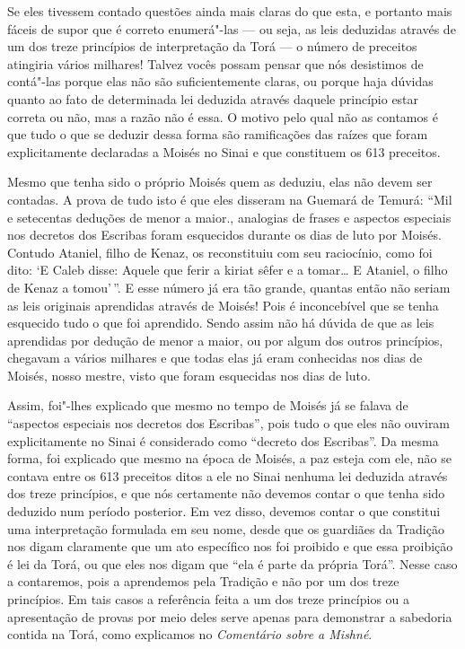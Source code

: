 Se eles tivessem contado questões ainda mais claras do que esta, e
portanto mais fáceis de supor que é correto enumerá"-las --- ou seja, as
leis deduzidas através de um dos treze princípios de interpretação da
Torá\starr{} --- o número de preceitos atingiria vários milhares! Talvez vocês
possam pensar que nós desistimos de contá"-las porque elas não são
suficientemente claras, ou porque haja dúvidas quanto ao fato de
determinada lei deduzida através daquele princípio estar correta ou não,
mas a razão não é essa. O motivo pelo qual não as contamos é que tudo o
que se deduzir dessa forma são ramificações das raízes que foram
explicitamente declaradas a Moisés no Sinai e que constituem os 613
preceitos.

Mesmo que tenha sido o próprio Moisés quem as deduziu, elas não devem
ser contadas. A prova de tudo isto é que eles disseram na Guemará\starr{} de
Temurá\starr: ``Mil e setecentas deduções de menor a maior., analogias de
frases e aspectos especiais nos decretos dos Escribas foram esquecidos
durante os dias de luto por Moisés. Contudo Ataniel, filho de Kenaz\starr, os
reconstituiu com seu raciocínio, como foi dito: `E Caleb\starr{} disse: Aquele
que ferir a kiriat sêfer\starr{} e a tomar\ldots{} E Ataniel, o filho de Kenaz\starr{} a
tomou'\,''. E esse número já era tão grande, quantas então não seriam as
leis originais aprendidas através de Moisés! Pois é inconcebível que se
tenha esquecido tudo o que foi aprendido. Sendo assim não há dúvida de
que as leis aprendidas por dedução de menor a maior, ou por algum dos
outros princípios, chegavam a vários milhares e que todas elas já eram
conhecidas nos dias de Moisés, nosso mestre, visto que foram esquecidas
nos dias de luto.

Assim, foi"-lhes explicado que mesmo no tempo de Moisés já se falava de
``aspectos especiais nos decretos dos Escribas'', pois tudo o que eles
não ouviram explicitamente no Sinai é considerado como ``decreto dos
Escribas''. Da mesma forma, foi explicado que mesmo na época de Moisés,
a paz esteja com ele, não se contava entre os 613 preceitos ditos a ele
no Sinai nenhuma lei deduzida através dos treze princípios, e que nós
certamente não devemos contar o que tenha sido deduzido num período
posterior. Em vez disso, devemos contar o que constitui uma
interpretação formulada em seu nome, desde que os guardiães da Tradição
nos digam claramente que um ato específico nos foi proibido e que essa
proibição é lei da Torá\starr, ou que eles nos digam que ``ela é parte da
própria Torá\starr''. Nesse caso a contaremos, pois a aprendemos pela
Tradição e não por um dos treze princípios. Em tais casos a referência
feita a um dos treze princípios ou a apresentação de provas por meio
deles serve apenas para demonstrar a sabedoria contida na Torá\starr, como
explicamos no \emph{Comentário sobre a Mishné}.

